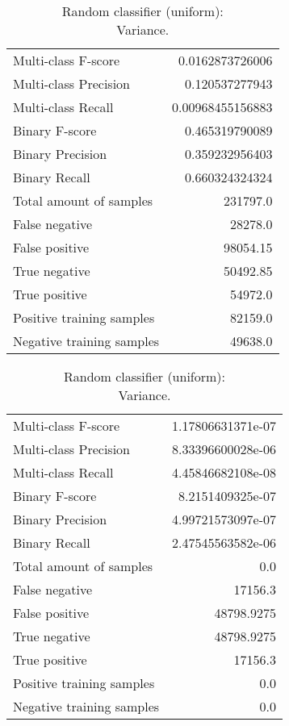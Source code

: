 \begin{table}[H]
\begin{minipage}{0.5\textwidth}
\caption{Random classifier (uniform): \\Average.}
\centering
\begin{tabular}{l r}
\toprule
Multi-class F-score & 0.0162873726006 \\
Multi-class Precision & 0.120537277943 \\
Multi-class Recall & 0.00968455156883 \\
\midrule
Binary F-score & 0.465319790089 \\
Binary Precision & 0.359232956403 \\
Binary Recall & 0.660324324324 \\
\midrule
Total amount of samples & 231797.0 \\
False negative & 28278.0 \\
False positive & 98054.15 \\
True negative & 50492.85 \\
True positive & 54972.0 \\
\midrule
Positive training samples & 82159.0 \\
Negative training samples & 49638.0 \\
\bottomrule
\end{tabular}
\end{minipage}
\hfillx
\begin{minipage}{0.5\textwidth}
\caption{Random classifier (uniform): \\Variance.}
\centering
\begin{tabular}{l r}
\toprule
Multi-class F-score & 1.17806631371e-07 \\
Multi-class Precision & 8.33396600028e-06 \\
Multi-class Recall & 4.45846682108e-08 \\
\midrule
Binary F-score & 8.2151409325e-07 \\
Binary Precision & 4.99721573097e-07 \\
Binary Recall & 2.47545563582e-06 \\
\midrule
Total amount of samples & 0.0 \\
False negative & 17156.3 \\
False positive & 48798.9275 \\
True negative & 48798.9275 \\
True positive & 17156.3 \\
\midrule
Positive training samples & 0.0 \\
Negative training samples & 0.0 \\
\bottomrule
\end{tabular}
\end{minipage}
\end{table}
